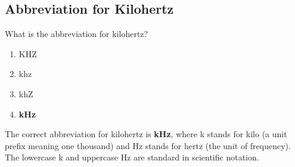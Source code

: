 \subsection{Abbreviation for Kilohertz}
\label{T5C13}

\begin{tcolorbox}[colback=gray!10!white,colframe=black!75!black,title=T5C13]
What is the abbreviation for kilohertz?
\begin{enumerate}[noitemsep]
    \item KHZ
    \item khz
    \item khZ
    \item \textbf{kHz}
\end{enumerate}
\end{tcolorbox}

The correct abbreviation for kilohertz is \textbf{kHz}, where k stands for kilo (a unit prefix meaning one thousand) and Hz stands for hertz (the unit of frequency). The lowercase k and uppercase Hz are standard in scientific notation.